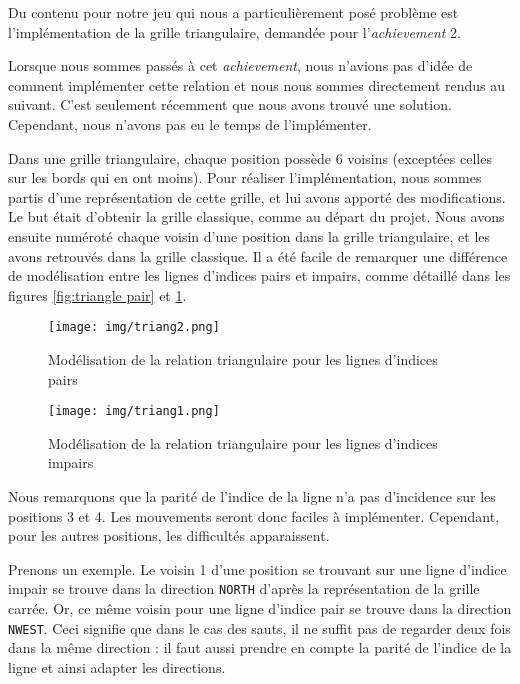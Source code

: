 \documentclass[a4paper]{article}
\begin{document}
Du contenu pour notre jeu qui nous a particulièrement posé problème est l'implémentation de la grille triangulaire, demandée pour l'\emph{achievement} 2.

Lorsque nous sommes passés à cet \emph{achievement}, nous n'avions pas d'idée de comment implémenter cette relation et nous nous sommes directement rendus au suivant. C'est seulement récemment que nous avons trouvé une solution. Cependant, nous n'avons pas eu le temps de l'implémenter.

\vspace{0.5cm}

Dans une grille triangulaire, chaque position possède 6 voisins (exceptées celles sur les bords qui
en ont moins). Pour réaliser l'implémentation, nous sommes partis d'une représentation de cette grille, et lui avons apporté des modifications. Le but était d'obtenir la grille classique, comme au départ du projet. Nous avons ensuite numéroté chaque voisin d'une position dans la grille triangulaire, et les avons retrouvés dans la grille classique. Il a été facile de remarquer une différence de modélisation entre les lignes d'indices pairs et impairs, comme détaillé dans les figures \ref{fig:triangle pair} et \ref{fig:triangle impair}.

\begin{center}
\begin{figure}[H]

    \texttt{[image: img/triang2.png]}
    \caption{Modélisation de la relation triangulaire pour les lignes d'indices pairs}
    \label{fig:triangle pair}
    
    \texttt{[image: img/triang1.png]}
    \caption{Modélisation de la relation triangulaire pour les lignes d'indices impairs}
    \label{fig:triangle impair}
    
\end{figure}
\end{center}

Nous remarquons que la parité de l'indice de la ligne n'a pas d'incidence sur les positions 3 et 4. Les mouvements seront donc faciles à implémenter. Cependant, pour les autres positions, les difficultés apparaissent.

Prenons un exemple. Le voisin 1 d'une position se trouvant sur une ligne d'indice impair se trouve dans la direction \verb|NORTH| d'après la représentation de la grille carrée. Or, ce même voisin pour une ligne d'indice pair se trouve dans la direction \verb|NWEST|. Ceci signifie que dans le cas des sauts, il ne suffit pas de regarder deux fois dans la même direction : il faut aussi prendre en compte la parité de l'indice de la ligne et ainsi adapter les directions.
\end{document}
